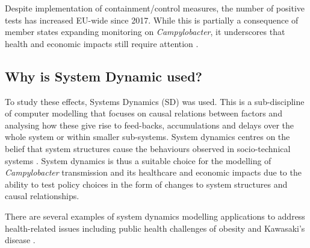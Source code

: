 
Despite implementation of containment/control measures, the number of positive tests has increased EU-wide since 2017. While this is partially a consequence of member states expanding monitoring on \textit{Campylobacter}, it underscores that health and economic impacts still require attention \parencite{nastasijevic_european_2020}.

\subsection*{Why is System Dynamic used?}

To study these effects, Systems Dynamics (SD) was used. This is a sub-discipline of computer modelling that focuses on causal relations between factors and analysing how these give rise to feed-backs, accumulations and delays over the whole system or within smaller sub-systems. System dynamics centres on the belief that system structures cause the behaviours observed in socio-technical systems \parencite{pruyt_triple_2013}. System dynamics is thus a suitable choice for the modelling of \textit{Campylobacter} transmission and its healthcare and economic impacts due to the ability to test policy choices in the form of changes to system structures and causal relationships.

There are several examples of system dynamics modelling applications to address health-related issues including public health challenges of obesity \parencite{chen_obesity_2018} and Kawasaki's disease \parencite{huang_epidemiology_2013}. 


